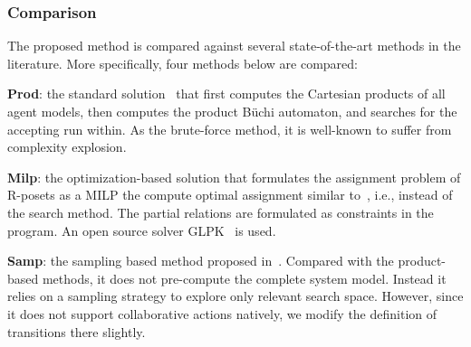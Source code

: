 \subsubsection{Comparison}\label{subsubsec:compare}
The proposed method is compared against several
state-of-the-art methods in the literature.
More specifically, four methods below are compared:

\textbf{Prod}: the standard solution~\citep{baier2008principles}
that first computes
the Cartesian products of all agent models,
then computes the product B\"uchi automaton,
and searches for the accepting run within.
As the brute-force method,
it is well-known to suffer from complexity explosion.

\textbf{Milp}: the optimization-based solution that
formulates the assignment problem of R-posets as a MILP
the compute optimal assignment similar
to~\citep{luo2021temporal, jones2019scratchs},
i.e., instead of the search method.
The partial relations are formulated as constraints
in the program.
An open source solver GLPK~\citep{makhorin2008glpk} is used.

\textbf{Samp}: the sampling based method proposed
in~\citep{kantaros2020stylus}.
Compared with the product-based methods, it does not pre-compute
the complete system model. Instead it relies on a sampling strategy
to explore only relevant search space.
However, since it does not support collaborative actions natively,
we modify the definition of transitions there slightly.

